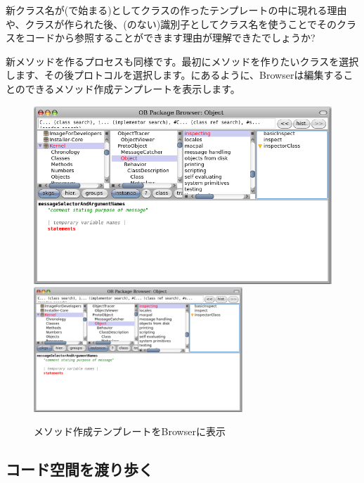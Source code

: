 \documentclass[a4paper,10pt,twoside]{book}
\begin{document}
新クラス名が(\ie \ct{#}で始まる)としてクラスの作ったテンプレートの中に現れる理由や、クラスが作られた後、(\ie \ct{#}のない)識別子としてクラス名を使うことでそのクラスをコードから参照することができます理由が理解できたでしょうか?

新メソッドを作るプロセスも同様です。最初にメソッドを作りたいクラスを選択します、その後プロトコルを選択します。にあるように、Browserは編集することのできるメソッド作成テンプレートを表示します。

\begin{figure}[htbp]
   \centering
   \ifluluelse
	   {\includegraphics [width=\textwidth]{SystemBrowserMethodTemplate}}
	   {\includegraphics[width=0.7\textwidth]{SystemBrowserMethodTemplate}}
   \caption{メソッド作成テンプレートをBrowserに表示
   }
\end{figure}

\subsection{コード空間を渡り歩く}
\end{document}
